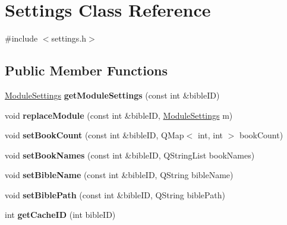 \hypertarget{classSettings}{
\section{Settings Class Reference}
\label{classSettings}
}


{\ttfamily \#include $<$settings.h$>$}\subsection*{Public Member Functions}
\begin{DoxyCompactItemize}
\item 
\hypertarget{classSettings_a823da407a40ae2fbe3031538cf498472}{
\hyperlink{classModuleSettings}{ModuleSettings} {\bfseries getModuleSettings} (const int \&bibleID)}
\label{classSettings_a823da407a40ae2fbe3031538cf498472}

\item 
\hypertarget{classSettings_a87353d9e5ca7e452c222b14772f8508b}{
void {\bfseries replaceModule} (const int \&bibleID, \hyperlink{classModuleSettings}{ModuleSettings} m)}
\label{classSettings_a87353d9e5ca7e452c222b14772f8508b}

\item 
\hypertarget{classSettings_a1a2648f466694632ffe5eb7df750bd90}{
void {\bfseries setBookCount} (const int \&bibleID, QMap$<$ int, int $>$ bookCount)}
\label{classSettings_a1a2648f466694632ffe5eb7df750bd90}

\item 
\hypertarget{classSettings_a3468c250761c7db0e4b61f9e67ecb079}{
void {\bfseries setBookNames} (const int \&bibleID, QStringList bookNames)}
\label{classSettings_a3468c250761c7db0e4b61f9e67ecb079}

\item 
\hypertarget{classSettings_a9733ed2848412829c96150f8d3cdbd55}{
void {\bfseries setBibleName} (const int \&bibleID, QString bibleName)}
\label{classSettings_a9733ed2848412829c96150f8d3cdbd55}

\item 
\hypertarget{classSettings_a9abc0c2e1e4558e42318b041bb691dea}{
void {\bfseries setBiblePath} (const int \&bibleID, QString biblePath)}
\label{classSettings_a9abc0c2e1e4558e42318b041bb691dea}

\item 
\hypertarget{classSettings_a36a9eb5b9a02bcd8f2e28f944162992a}{
int {\bfseries getCacheID} (int bibleID)}
\label{classSettings_a36a9eb5b9a02bcd8f2e28f944162992a}


\end{DoxyCompactItemize}
